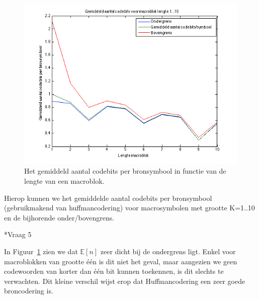 \documentclass[]{article}
\begin{document}
\begin{section}
\begin{subsection}
        \begin{figure}[h]
            \includegraphics[scale=0.75]{vraag1_4.png}
            \caption{Het gemiddeld aantal codebits per bronsymbool in
            functie van de lengte van een macroblok.}
            \label{fig:codebits}
        \end{figure}

        Hierop kunnen we het gemiddelde aantal codebits per bronsymbool
        (gebruikmakend van huffmancodering) voor macrosymbolen met
        grootte K=1..10 en de bijhorende onder/bovengrens.

		
    \end{subsection}

    \begin{subsection}*{Vraag 5}

        In Figuur~\ref{fig:codebits} zien we dat $\mathbb{E}[n]$ zeer
        dicht bij de ondergrens ligt. Enkel voor macroblokken van
        grootte \'e\'en is dit niet het geval, maar aangezien we geen
        codewoorden van korter dan \'e\'en bit kunnen toekennen, is dit
        slechts te verwachten. Dit kleine verschil wijst erop dat
        Huffmancodering een zeer goede broncodering is.

    \end{subsection}
    

\end{section}
\end{document}
